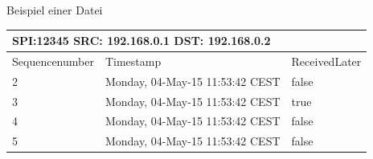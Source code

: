 \noindent 

\noindent Beispiel einer Datei

\begin{tabular}{|p{0.9in}|p{1.7in}|p{0.8in}|} \hline 
\multicolumn{2}{|p{1in}|}{SPI:12345 SRC: 192.168.0.1 DST: 192.168.0.2} &  \\ \hline 
Sequencenumber & Timestamp & ReceivedLater \\ \hline 
2 & Monday, 04-May-15 11:53:42 CEST & false \\ \hline 
3 & Monday, 04-May-15 11:53:42 CEST & true \\ \hline 
4 & Monday, 04-May-15 11:53:42 CEST & false \\ \hline 
5 & Monday, 04-May-15 11:53:42 CEST & false \\ \hline 
\end{tabular}



\noindent 
